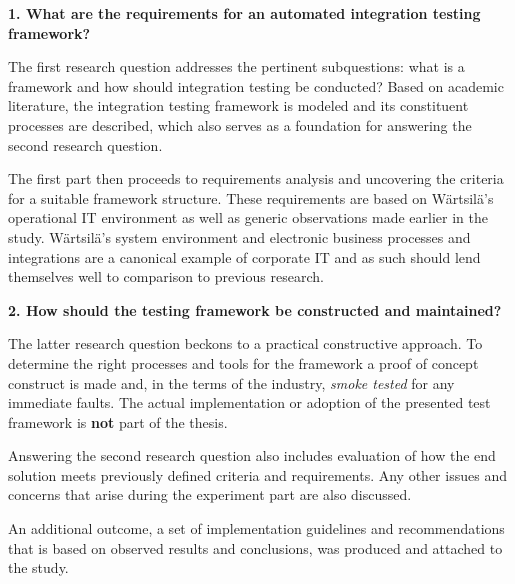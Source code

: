\documentclass[12pt,a4paper,oneside,pdftex]{report}
\begin{document}
\begin{adjustwidth}{2.5em}{0pt}
\textbf{1. What are the requirements for an automated integration testing framework?} \\
\end{adjustwidth}

The first research question addresses the pertinent subquestions: what is a framework and how should integration testing be conducted? Based on academic literature, the integration testing framework is modeled and its constituent processes are described, which also serves as a foundation for answering the second research question.

The first part then proceeds to requirements analysis and uncovering the criteria for a suitable framework structure. These requirements are based on Wärtsilä's operational IT environment as well as generic observations made earlier in the study. Wärtsilä's system environment and electronic business processes and integrations are a canonical example of corporate IT and as such should lend themselves well to comparison to previous research. \\


\begin{adjustwidth}{2.5em}{0pt}
\textbf{2. How should the testing framework be constructed and maintained?} \\
\end{adjustwidth}

The latter research question beckons to a practical constructive approach. To determine the right processes and tools for the framework a proof of concept construct is made and, in the terms of the industry, \emph{smoke tested} for any immediate faults. The actual implementation or adoption of the presented test framework is \textbf{not} part of the thesis.

Answering the second research question also includes evaluation of how the end solution meets previously defined criteria and requirements. Any other issues and concerns that arise during the experiment part are also discussed.

An additional outcome, a set of implementation guidelines and recommendations that is based on observed results and conclusions, was produced and attached to the study. %
\end{document}
